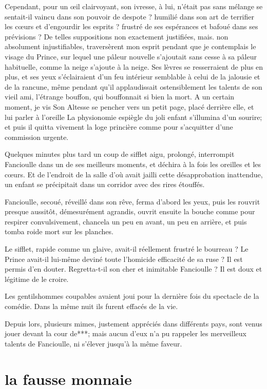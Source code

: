 Cependant, pour un \oe il clairvoyant, son ivresse, à lui,
n’était pas sans mélange se sentait{}-il vaincu dans
son pouvoir de despote ? humilié dans son art de terrifier les c\oe urs
et d’engourdir les esprits ? frustré de ses espérances
et bafoué dans ses prévisions ? De telles suppositions non exactement
justifiées, mais. non absolument injustifiables, traversèrent mon
esprit pendant que je contemplais le visage du Prince, sur lequel une
pâleur nouvelle s’ajoutait sans cesse à sa pâleur
habituelle, comme la neige s’ajoute à la neige. Ses
lèvres se resserraient de plus en plus, et ses yeux
s’éclairaient d’un feu intérieur
semblable à celui de la jalousie et de la rancune, même pendant
qu’il applaudissait ostensiblement les talents de son
vieil ami, l’étrange bouffon, qui bouffonnait si bien
la mort. A un certain moment, je vis Son Altesse se pencher vers un
petit page, placé derrière elle, et lui parler à
l’oreille La physionomie espiègle du joli enfant
s’illumina d’un sourire; et puis il
quitta vivement la loge princière comme pour
s’acquitter d’une commission urgente.

Quelques minutes plus tard un coup de sifflet aigu, prolongé,
interrompit Fancioulle dans un de ses meilleurs moments, et déchira à
la fois les oreilles et les c\oe urs. Et de l’endroit de
la salle d’où avait jailli cette désapprobation
inattendue, un enfant se précipitait dans un corridor avec des rires
étouffés.

Fancioulle, secoué, réveillé dans son rêve, ferma
d’abord les yeux, puis les rouvrit presque aussitôt,
démesurément agrandis, ouvrit ensuite la bouche comme pour respirer
convulsivement, chancela un peu en avant, un peu en arrière, et puis
tomba roide mort sur les planches.

Le sifflet, rapide comme un glaive, avait{}-il réellement frustré le
bourreau ? Le Prince avait{}-il lui{}-même deviné toute
l’homicide efficacité de sa ruse ? Il est permis
d’en douter. Regretta{}-t{}-il son cher et inimitable
Fancioulle ? Il est doux et légitime de le croire.

Les gentilshommes coupables avaient joui pour la dernière fois du
spectacle de la comédie. Dans la même nuit ils furent effacés de la
vie.

Depuis lors, plusieurs mimes, justement appréciés dans différents pays,
sont venus jouer devant la cour de***; mais aucun
d’eux n’a pu rappeler les merveilleux
talents de Fancioulle, ni s’élever
jusqu’à la même faveur.
 
\quebra\section[La fausse monnaie]{la fausse monnaie}

